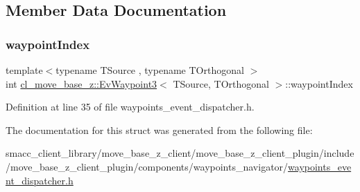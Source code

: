 \subsection{Member Data Documentation}
\mbox{\label{structcl__move__base__z_1_1EvWaypoint3_a6db7d0f5861b7adec2d5671e3d2db7af}} 
\subsubsection{\texorpdfstring{waypoint\+Index}{waypointIndex}}
{\footnotesize\ttfamily template$<$typename T\+Source , typename T\+Orthogonal $>$ \\
int \hyperlink{structcl__move__base__z_1_1EvWaypoint3}{cl\+\_\+move\+\_\+base\+\_\+z\+::\+Ev\+Waypoint3}$<$ T\+Source, T\+Orthogonal $>$\+::waypoint\+Index}



Definition at line 35 of file waypoints\+\_\+event\+\_\+dispatcher.\+h.



The documentation for this struct was generated from the following file\+:\begin{DoxyCompactItemize}
\item 
smacc\+\_\+client\+\_\+library/move\+\_\+base\+\_\+z\+\_\+client/move\+\_\+base\+\_\+z\+\_\+client\+\_\+plugin/include/move\+\_\+base\+\_\+z\+\_\+client\+\_\+plugin/components/waypoints\+\_\+navigator/\hyperlink{waypoints__event__dispatcher_8h}{waypoints\+\_\+event\+\_\+dispatcher.\+h}\end{DoxyCompactItemize}
